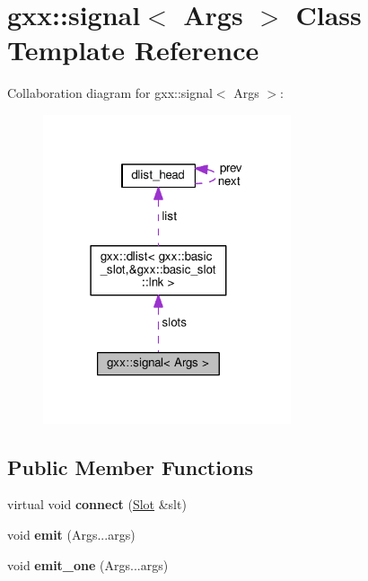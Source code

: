 \hypertarget{classgxx_1_1signal}{}\section{gxx\+:\+:signal$<$ Args $>$ Class Template Reference}
\label{classgxx_1_1signal}


Collaboration diagram for gxx\+:\+:signal$<$ Args $>$\+:
\nopagebreak
\begin{figure}[H]
\begin{center}
\leavevmode
\includegraphics[width=207pt]{classgxx_1_1signal__coll__graph}
\end{center}
\end{figure}
\subsection*{Public Member Functions}
\begin{DoxyCompactItemize}
\item 
virtual void {\bfseries connect} (\hyperlink{classgxx_1_1basic__slot}{Slot} \&slt)\hypertarget{classgxx_1_1signal_af0aa2418e88b23f1204ac941e75f242f}{}\label{classgxx_1_1signal_af0aa2418e88b23f1204ac941e75f242f}

\item 
void {\bfseries emit} (Args...\+args)\hypertarget{classgxx_1_1signal_acfe2da1719a4789f8a1a2ccad7722907}{}\label{classgxx_1_1signal_acfe2da1719a4789f8a1a2ccad7722907}

\item 
void {\bfseries emit\+\_\+one} (Args...\+args)\hypertarget{classgxx_1_1signal_ad12d75e0caa0e21834f9264c6633eb4d}{}\label{classgxx_1_1signal_ad12d75e0caa0e21834f9264c6633eb4d}

\end{DoxyCompactItemize}
